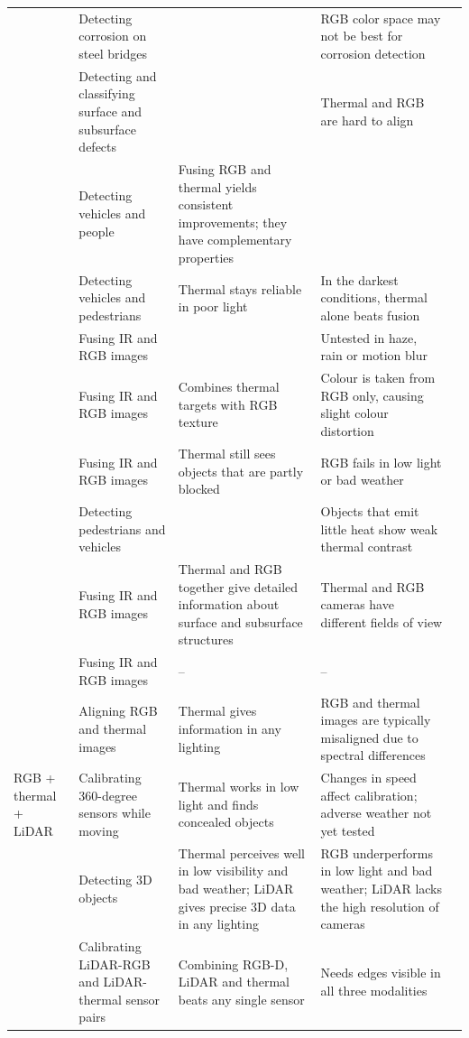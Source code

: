 {\begin{xltabular}{\textwidth}{>{\RaggedRight\arraybackslash}p{2.1cm}>{\RaggedRight\arraybackslash}p{2.9cm}>{\RaggedRight\arraybackslash}X>{\RaggedRight\arraybackslash}Xp{0.95cm}}
 & Detecting corrosion on steel bridges &  & RGB color space may not be best for corrosion detection & \citep{Lim2021} \\
 & Detecting and classifying surface and subsurface defects &  & Thermal and RGB are hard to align & \citep{Li2024c} \\
 & Detecting vehicles and people & Fusing RGB and thermal yields consistent improvements; they have complementary properties &  & \citep{Liu2025} \\
 & Detecting vehicles and pedestrians & Thermal stays reliable in poor light & In the darkest conditions, thermal alone beats fusion & \citep{Jiang2024} \\
 & Fusing IR and RGB images &  & Untested in haze, rain or motion blur & \citep{An2026} \\
 & Fusing IR and RGB images & Combines thermal targets with RGB texture & Colour is taken from RGB only, causing slight colour distortion & \citep{Xu2026} \\
 & Fusing IR and RGB images & Thermal still sees objects that are partly blocked & RGB fails in low light or bad weather & \citep{Chen2026a} \\
 & Detecting pedestrians and vehicles &  & Objects that emit little heat show weak thermal contrast & \citep{Wang2026b} \\
 & Fusing IR and RGB images & Thermal and RGB together give detailed information about surface and subsurface structures & Thermal and RGB cameras have different fields of view & \citep{Shahsavarani2024} \\
 & Fusing IR and RGB images & -- & -- & \citep{Zhou2026} \\
 & Aligning RGB and thermal images & Thermal gives information in any lighting & RGB and thermal images are typically misaligned due to spectral differences & \citep{Bin2023} \\
\midrule
RGB + thermal + LiDAR & Calibrating 360-degree sensors while moving & Thermal works in low light and finds concealed objects & Changes in speed affect calibration; adverse weather not yet tested & \citep{Tran2024} \\
 & Detecting 3D objects & Thermal perceives well in low visibility and bad weather; LiDAR gives precise 3D data in any lighting & RGB underperforms in low light and bad weather; LiDAR lacks the high resolution of cameras & \citep{Tran2025} \\
 & Calibrating LiDAR-RGB and LiDAR-thermal sensor pairs & Combining RGB-D, LiDAR and thermal beats any single sensor & Needs edges visible in all three modalities & \citep{Yang2024} \\

\end{xltabular}}
